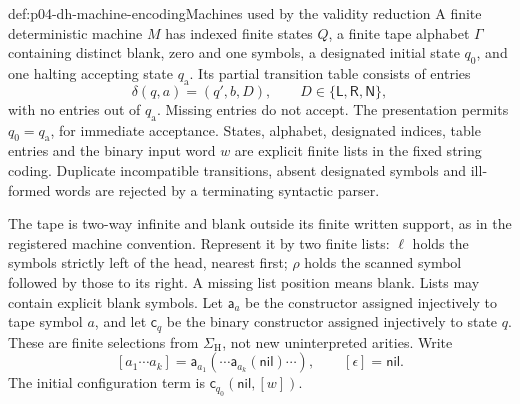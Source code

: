 \begin{hbdefinition}{def:p04-dh-machine-encoding}{Machines used by the validity reduction}
A finite deterministic machine \(M\) has indexed finite states \(Q\),
a finite tape alphabet \(\Gamma\) containing distinct blank, zero and
one symbols, a designated initial state \(q_0\), and one halting
accepting state \(q_{\mathrm a}\). Its partial transition table consists
of entries
\[
 \delta(q,a)=(q',b,D),\qquad D\in\{\mathsf L,\mathsf R,\mathsf N\},
\]
with no entries out of \(q_{\mathrm a}\).
Missing entries do not accept. The presentation permits
\(q_0=q_{\mathrm a}\), for immediate acceptance.
States, alphabet, designated indices, table entries and the binary input
word \(w\) are explicit finite lists in the fixed string coding.
Duplicate incompatible transitions, absent designated symbols and
ill-formed words are rejected by a terminating syntactic parser.

The tape is two-way infinite and blank outside its finite written
support, as in the registered machine convention. Represent it by two
finite lists: \(\ell\) holds the symbols strictly left of the head,
nearest first; \(\rho\) holds the scanned symbol followed by those to
its right. A missing list position means blank. Lists may contain
explicit blank symbols. Let \(\mathsf a_a\) be the constructor assigned
injectively to tape symbol \(a\), and let \(\mathsf c_q\) be the binary
constructor assigned injectively to state \(q\). These are finite
selections from \(\Sigma_{\mathrm H}\), not new uninterpreted arities.
Write
\[
 [a_1\cdots a_k]
 =\mathsf a_{a_1}(\cdots\mathsf a_{a_k}(\mathsf{nil})\cdots),
 \qquad [\epsilon]=\mathsf{nil}.
\]
The initial configuration term is
\(\mathsf c_{q_0}(\mathsf{nil},[w])\).
\end{hbdefinition}

